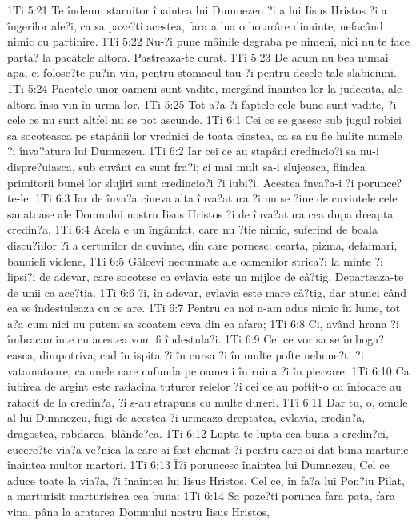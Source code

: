 1Ti 5:21  Te îndemn staruitor înaintea lui Dumnezeu ?i a lui Iisus Hristos ?i a îngerilor ale?i, ca sa paze?ti acestea, fara a lua o hotarâre dinainte, nefacând nimic cu partinire.
1Ti 5:22  Nu-?i pune mâinile degraba pe nimeni, nici nu te face parta? la pacatele altora. Pastreaza-te curat.
1Ti 5:23  De acum nu bea numai apa, ci folose?te pu?in vin, pentru stomacul tau ?i pentru desele tale slabiciuni.
1Ti 5:24  Pacatele unor oameni sunt vadite, mergând înaintea lor la judecata, ale altora însa vin în urma lor.
1Ti 5:25  Tot a?a ?i faptele cele bune sunt vadite, ?i cele ce nu sunt altfel nu se pot ascunde.
1Ti 6:1  Cei ce se gasesc sub jugul robiei sa socoteasca pe stapânii lor vrednici de toata cinstea, ca sa nu fie hulite numele ?i înva?atura lui Dumnezeu.
1Ti 6:2  Iar cei ce au stapâni credincio?i sa nu-i dispre?uiasca, sub cuvânt ca sunt fra?i; ci mai mult sa-i slujeasca, fiindca primitorii bunei lor slujiri sunt credincio?i ?i iubi?i. Acestea înva?a-i ?i porunce?te-le.
1Ti 6:3  Iar de înva?a cineva alta înva?atura ?i nu se ?ine de cuvintele cele sanatoase ale Domnului nostru Iisus Hristos ?i de înva?atura cea dupa dreapta credin?a,
1Ti 6:4  Acela e un îngâmfat, care nu ?tie nimic, suferind de boala discu?iilor ?i a certurilor de cuvinte, din care pornesc: cearta, pizma, defaimari, banuieli viclene,
1Ti 6:5  Gâlcevi necurmate ale oamenilor strica?i la minte ?i lipsi?i de adevar, care socotesc ca evlavia este un mijloc de câ?tig. Departeaza-te de unii ca ace?tia.
1Ti 6:6  ?i, în adevar, evlavia este mare câ?tig, dar atunci când ea se îndestuleaza cu ce are.
1Ti 6:7  Pentru ca noi n-am adus nimic în lume, tot a?a cum nici nu putem sa scoatem ceva din ea afara;
1Ti 6:8  Ci, având hrana ?i îmbracaminte cu acestea vom fi îndestula?i.
1Ti 6:9  Cei ce vor sa se îmboga?easca, dimpotriva, cad în ispita ?i în cursa ?i în multe pofte nebune?ti ?i vatamatoare, ca unele care cufunda pe oameni în ruina ?i în pierzare.
1Ti 6:10  Ca iubirea de argint este radacina tuturor relelor ?i cei ce au poftit-o cu înfocare au ratacit de la credin?a, ?i s-au strapuns cu multe dureri.
1Ti 6:11  Dar tu, o, omule al lui Dumnezeu, fugi de acestea ?i urmeaza dreptatea, evlavia, credin?a, dragostea, rabdarea, blânde?ea.
1Ti 6:12  Lupta-te lupta cea buna a credin?ei, cucere?te via?a ve?nica la care ai fost chemat ?i pentru care ai dat buna marturie înaintea multor martori.
1Ti 6:13  Î?i poruncesc înaintea lui Dumnezeu, Cel ce aduce toate la via?a, ?i înaintea lui Iisus Hristos, Cel ce, în fa?a lui Pon?iu Pilat, a marturisit marturisirea cea buna:
1Ti 6:14  Sa paze?ti porunca fara pata, fara vina, pâna la aratarea Domnului nostru Iisus Hristos,
